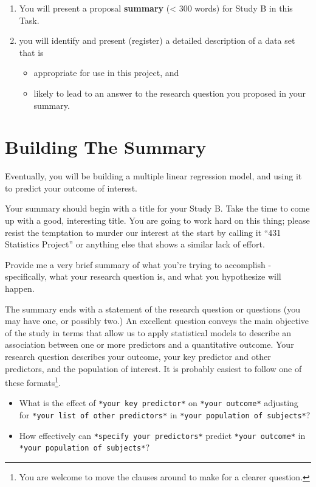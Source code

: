 \documentclass[]{book}
\providecommand{\tightlist}{%
  \setlength{\itemsep}{0pt}\setlength{\parskip}{0pt}}
\let\rmarkdownfootnote\footnote%
\def\footnote{\protect\rmarkdownfootnote}
\begin{document}
\begin{enumerate}
\def\labelenumi{\arabic{enumi}.}
\tightlist
\item
  You will present a proposal \textbf{summary} (\textless{} 300 words) for Study B in this Task.
\item
  you will identify and present (register) a detailed description of a data set that is

  \begin{itemize}
  \tightlist
  \item
    appropriate for use in this project, and
  \item
    likely to lead to an answer to the research question you proposed in your summary.
  \end{itemize}
\end{enumerate}

\hypertarget{building-the-summary}{%
\section{Building The Summary}\label{building-the-summary}}

Eventually, you will be building a multiple linear regression model, and using it to predict your outcome of interest.

Your summary should begin with a title for your Study B. Take the time to come up with a good, interesting title. You are going to work hard on this thing; please resist the temptation to murder our interest at the start by calling it ``431 Statistics Project'' or anything else that shows a similar lack of effort.

Provide me a very brief summary of what you're trying to accomplish - specifically, what your research question is, and what you hypothesize will happen.

The summary ends with a statement of the research question or questions (you may have one, or possibly two.) An excellent question conveys the main objective of the study in terms that allow us to apply statistical models to describe an association between one or more predictors and a quantitative outcome. Your research question describes your outcome, your key predictor and other predictors, and the population of interest. It is probably easiest to follow one of these formats\footnote{You are welcome to move the clauses around to make for a clearer question.}.

\begin{itemize}
\tightlist
\item
  What is the effect of \texttt{*your\ key\ predictor*} on \texttt{*your\ outcome*} adjusting for \texttt{*your\ list\ of\ other\ predictors*} in \texttt{*your\ population\ of\ subjects*}?
\item
  How effectively can \texttt{*specify\ your\ predictors*} predict \texttt{*your\ outcome*} in \texttt{*your\ population\ of\ subjects*}?
\end{itemize}
\end{document}
